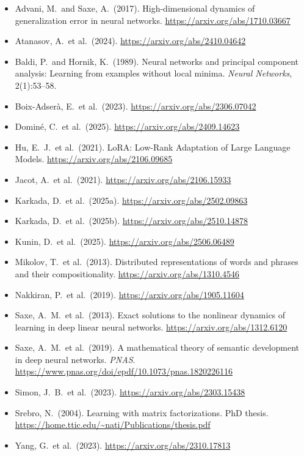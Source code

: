 \documentclass[12pt]{article}
\begin{document}
\begin{itemize}[leftmargin=*]
    \item Advani, M.\ and Saxe, A.\ (2017). High-dimensional dynamics of generalization error in neural networks. \url{https://arxiv.org/abs/1710.03667}

    \item Atanasov, A.\ et al.\ (2024). \url{https://arxiv.org/abs/2410.04642}

    \item Baldi, P.\ and Hornik, K.\ (1989). Neural networks and principal component analysis: Learning from examples without local minima. \textit{Neural Networks}, 2(1):53--58.

    \item Boix-Adser\`{a}, E.\ et al.\ (2023). \url{https://arxiv.org/abs/2306.07042}

    \item Domin\'{e}, C.\ et al.\ (2025). \url{https://arxiv.org/abs/2409.14623}

    \item Hu, E.\ J.\ et al.\ (2021). LoRA: Low-Rank Adaptation of Large Language Models. \url{https://arxiv.org/abs/2106.09685}

    \item Jacot, A.\ et al.\ (2021). \url{https://arxiv.org/abs/2106.15933}

    \item Karkada, D.\ et al.\ (2025a). \url{https://arxiv.org/abs/2502.09863}

    \item Karkada, D.\ et al.\ (2025b). \url{https://arxiv.org/abs/2510.14878}

    \item Kunin, D.\ et al.\ (2025). \url{https://arxiv.org/abs/2506.06489}

    \item Mikolov, T.\ et al.\ (2013). Distributed representations of words and phrases and their compositionality. \url{https://arxiv.org/abs/1310.4546}

    \item Nakkiran, P.\ et al.\ (2019). \url{https://arxiv.org/abs/1905.11604}

    \item Saxe, A.\ M.\ et al.\ (2013). Exact solutions to the nonlinear dynamics of learning in deep linear neural networks. \url{https://arxiv.org/abs/1312.6120}

    \item Saxe, A.\ M.\ et al.\ (2019). A mathematical theory of semantic development in deep neural networks. \textit{PNAS}. \url{https://www.pnas.org/doi/epdf/10.1073/pnas.1820226116}

    \item Simon, J.\ B.\ et al.\ (2023). \url{https://arxiv.org/abs/2303.15438}

    \item Srebro, N.\ (2004). Learning with matrix factorizations. PhD thesis. \url{https://home.ttic.edu/~nati/Publications/thesis.pdf}

    \item Yang, G.\ et al.\ (2023). \url{https://arxiv.org/abs/2310.17813}
\end{itemize}
\end{document}

